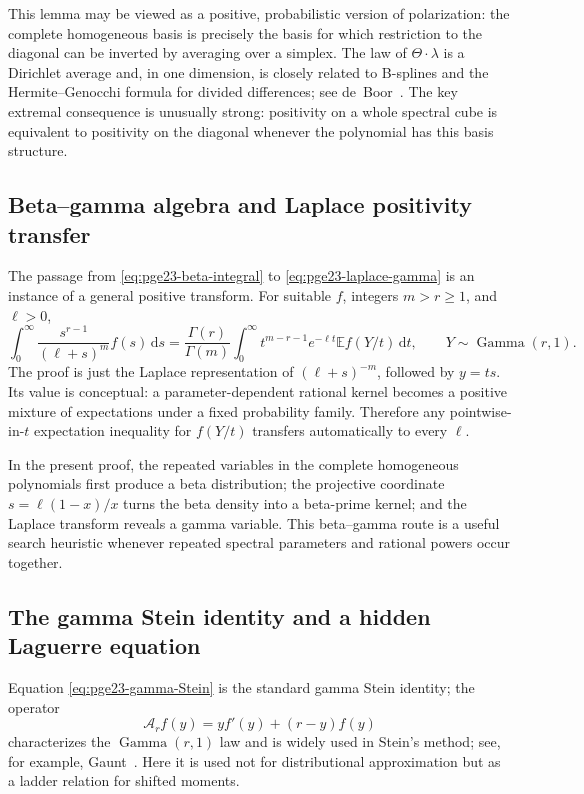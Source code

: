 \documentclass[11pt]{article}
\numberwithin{equation}{section}
\newcommand{\dd}{\,\mathrm d}
\newcommand{\E}{\mathbb E}
\newcommand{\GammaLaw}{\operatorname{Gamma}}
\begin{document}
This lemma may be viewed as a positive, probabilistic version of
polarization: the complete homogeneous basis is precisely the basis for
which restriction to the diagonal can be inverted by averaging over a
simplex.  The law of $\Theta\cdot\lambda$ is a Dirichlet average and, in
one dimension, is closely related to B-splines and the Hermite--Genocchi
formula for divided differences; see de~Boor~\cite{deBoor2005}.  The key
extremal consequence is unusually strong: positivity on a whole spectral
cube is equivalent to positivity on the diagonal whenever the polynomial
has this basis structure.

\subsection{Beta--gamma algebra and Laplace positivity transfer}

The passage from \eqref{eq:pge23-beta-integral} to
\eqref{eq:pge23-laplace-gamma} is an instance of a general positive
transform.  For suitable $f$, integers $m>r\ge1$, and $\ell>0$,
\begin{equation}\label{eq:general-laplace-transfer}
  \int_0^\infty\frac{s^{r-1}}{(\ell+s)^m}f(s)\dd s
  =\frac{\Gamma(r)}{\Gamma(m)}
  \int_0^\infty t^{m-r-1}e^{-\ell t}
  \E f(Y/t)\dd t,
  \qquad Y\sim\GammaLaw(r,1).
\end{equation}
The proof is just the Laplace representation of $(\ell+s)^{-m}$, followed
by $y=ts$.  Its value is conceptual: a parameter-dependent rational
kernel becomes a positive mixture of expectations under a fixed
probability family.  Therefore any pointwise-in-$t$ expectation inequality
for $f(Y/t)$ transfers automatically to every $\ell$.

In the present proof, the repeated variables in the complete homogeneous
polynomials first produce a beta distribution; the projective coordinate
$s=\ell(1-x)/x$ turns the beta density into a beta-prime kernel; and the
Laplace transform reveals a gamma variable.  This beta--gamma route is a
useful search heuristic whenever repeated spectral parameters and rational
powers occur together.

\subsection{The gamma Stein identity and a hidden Laguerre equation}

Equation \eqref{eq:pge23-gamma-Stein} is the standard gamma Stein identity; the
operator
\[
  \mathcal A_rf(y)=yf'(y)+(r-y)f(y)
\]
characterizes the $\GammaLaw(r,1)$ law and is widely used in Stein's
method; see, for example, Gaunt~\cite{Gaunt2016}.  Here it is used not for
distributional approximation but as a ladder relation for shifted moments.
\end{document}
